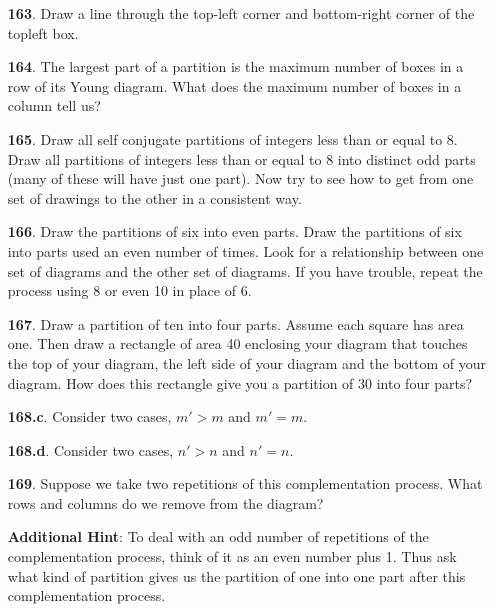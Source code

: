 \documentclass[10pt,]{book}
\theoremstyle{plain}
\theoremstyle{definition}
\theoremstyle{definition}
\numberwithin{equation}{chapter}
\newcommand{\gt}{>}
\begin{document}
\begin{itemize}[itemsep=1em]
\item[\textbf{163}.]\hypertarget{p-908}{}%
Draw a line through the top-left corner and bottom-right corner of the topleft box.%

\item[\textbf{164}.]\hypertarget{p-912}{}%
The largest part of a partition is the maximum number of boxes in a row of its Young diagram. What does the maximum number of boxes in a column tell us?%

\item[\textbf{165}.]\hypertarget{p-915}{}%
Draw all self conjugate partitions of integers less than or equal to 8.  Draw all partitions of integers less than or equal to 8 into distinct odd parts (many of these will have just one part). Now try to see how to get from one set of drawings to the other in a consistent way.%

\item[\textbf{166}.]\hypertarget{p-919}{}%
Draw the partitions of six into even parts. Draw the partitions of six into parts used an even number of times. Look for a relationship between one set of diagrams and the other set of diagrams. If you have trouble, repeat the process using 8 or even 10 in place of 6.%

\item[\textbf{167}.]\hypertarget{p-922}{}%
Draw a partition of ten into four parts. Assume each square has area one. Then draw a rectangle of area 40 enclosing your diagram that touches the top of your diagram, the left side of your diagram and the bottom of your diagram. How does this rectangle give you a partition of 30 into four parts?%

\item[\textbf{168.c}.]\hypertarget{p-930}{}%
Consider two cases, \(m' \gt m\) and \(m' = m\).%

\item[\textbf{168.d}.]\hypertarget{p-933}{}%
Consider two cases, \(n' \gt n\) and \(n' = n\).%

\item[\textbf{169}.]\hypertarget{p-940}{}%
Suppose we take two repetitions of this complementation process. What rows and columns do we remove from the diagram?%

\par\smallskip
\noindent\textbf{Additional Hint}: \hypertarget{p-941}{}%
To deal with an odd number of repetitions of the complementation process, think of it as an even number plus 1. Thus ask what kind of partition gives us the partition of one into one part after this complementation process.%


\end{itemize}
\end{document}
